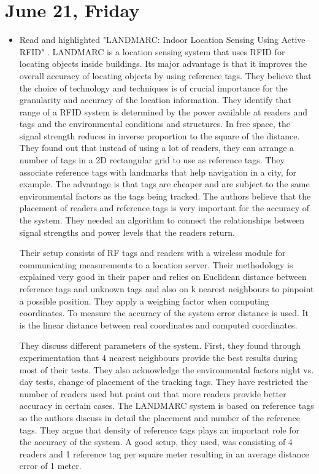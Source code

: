 \documentclass[a4paper,12pt]{article}
\begin{document}
\section{June 21, Friday}

\begin{itemize}
	\item Read and highlighted "LANDMARC: Indoor Location Sensing Using Active RFID" \cite{Ni2004}. LANDMARC is a location sensing system that uses RFID for locating objects inside buildings. Its major advantage is that it improves the overall accuracy of locating objects by using reference tags. They believe that the choice of technology and techniques is of crucial importance for the granularity and accuracy of the location information. They identify that range of a RFID system is determined by the power available at readers and tags and the environmental conditions and structures. In free space, the signal strength reduces in inverse proportion to the square of the distance. They found out that instead of using a lot of readers, they can arrange a number of tags in a 2D rectangular grid to use as reference tags. They associate reference tags with landmarks that help navigation in a city, for example. The advantage is that tags are cheaper and are subject to the same environmental factors as the tags being tracked. The authors believe that the placement of readers and reference tags is very important for the accuracy of the system. They needed an algorithm to connect the relationships between signal strengths and power levels that the readers return.
	
	Their setup consists of RF tags and readers with a wireless module for communicating measurements to a location server. Their methodology is explained very good in their paper and relies on Euclidean distance between reference tags and unknown tags and also on k nearest neighbours to pinpoint a possible position. They apply a weighing factor when computing coordinates. To measure the accuracy of the system error distance is used. It is the linear distance between real coordinates and computed coordinates.
	
	They discuss different parameters of the system. First, they found through experimentation that 4 nearest neighbours provide the best results during most of their tests. They also acknowledge the environmental factors night vs. day tests, change of placement of the tracking tags. They have restricted the number of readers used but point out that more readers provide better accuracy in certain cases. The LANDMARC system is based on reference tags so the authors discuss in detail the placement and number of the reference tags. They argue that density of reference tags plays an important role for the accuracy of the system. A good setup, they used, was consisting of 4 readers and 1 reference tag per square meter resulting in an average distance error of 1 meter.
	

\end{itemize}
\end{document}
